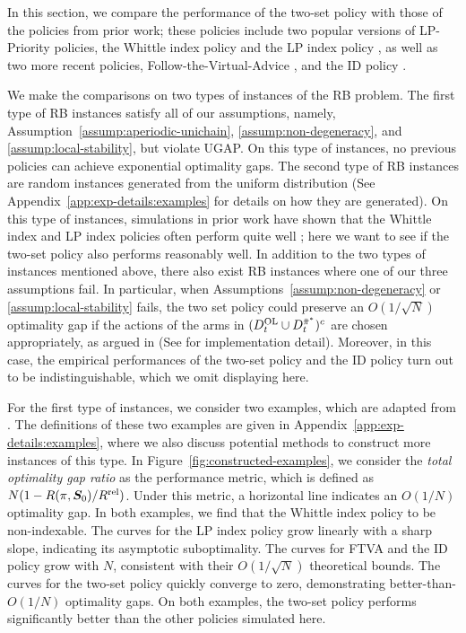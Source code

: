 \documentclass[11pt,letterpaper]{article}
\theoremstyle{plain}
\theoremstyle{definition}
\theoremstyle{remark}
\newcommand{\ve}[1]{\bm{#1}}
\newcommand{\veS}{\ve{S}}
\newcommand{\rel}{\textup{rel}} %
\newcommand{\ravg}{R}
\newcommand{\rsysn}{\ravg(\pi, \veS_0)}
\newcommand{\rrel}{\ravg^\rel}
\newcommand{\pibar}{{\sysbar{\pi}}}
\newcommand{\pibs}{{\pibar^*}}
\newcommand{\sysbar}[1]{\bar{#1}}
\newcommand{\Da}{D^{\pibs}}
\newcommand{\Db}{D^{\textup{OL}}}
\begin{document}
In this section, we compare the performance of the two-set policy with those of the policies from prior work; these policies include two popular versions of LP-Priority policies, the Whittle index policy \citep{Whi_88_rb} and the LP index policy \citep{GasGauYan_23_exponential}, as well as two more recent policies, Follow-the-Virtual-Advice \citep{HonXieCheWan_23}, and the ID policy \citep{HonXieCheWan_24}. 

We make the comparisons on two types of instances of the RB problem. The first type of RB instances satisfy all of our assumptions, namely, Assumption~\ref{assump:aperiodic-unichain}, \ref{assump:non-degeneracy}, and \ref{assump:local-stability}, but violate UGAP. On this type of instances, no previous policies can achieve exponential optimality gaps. 
The second type of RB instances are random instances generated from the uniform distribution (See Appendix~\ref{app:exp-details:examples} for details on how they are generated). On this type of instances, simulations in prior work have shown that the Whittle index and LP index policies often perform quite well \citep[see, e.g.][]{GasGauYan_23_exponential}; here we want to see if the two-set policy also performs reasonably well. 
In addition to the two types of instances mentioned above, there also exist RB instances where one of our three assumptions fail. 
In particular, when Assumptions~\ref{assump:non-degeneracy} or \ref{assump:local-stability} fails, the two set policy could preserve an $O(1/\sqrt{N})$ optimality gap if the actions of the arms in $(\Db_t\cup\Da_t)^c$ are chosen appropriately, as argued in  (See  for implementation detail). Moreover, in this case, the empirical performances of the two-set policy and the ID policy turn out to be indistinguishable, which we omit displaying here. 



For the first type of instances, we consider two examples, which are adapted from \cite{HonXieCheWan_23}. The definitions of these two examples are given in Appendix~\ref{app:exp-details:examples}, where we also discuss potential methods to construct more instances of this type. 
In Figure~\ref{fig:constructed-examples}, we consider the \emph{total optimality gap ratio} as the performance metric, which is defined as $N (1 - \rsysn/\rrel)$.  
Under this metric, a horizontal line indicates an $O(1/N)$ optimality gap. 
In both examples, we find that the Whittle index policy to be non-indexable. 
The curves for the LP index policy grow linearly with a sharp slope, indicating its asymptotic suboptimality. 
The curves for FTVA and the ID policy grow with $N$, consistent with their $O(1/\sqrt{N})$ theoretical bounds. 
The curves for the two-set policy quickly converge to zero, demonstrating better-than-$O(1/N)$ optimality gaps. 
On both examples, the two-set policy performs significantly better than the other policies simulated here. 
\end{document}
